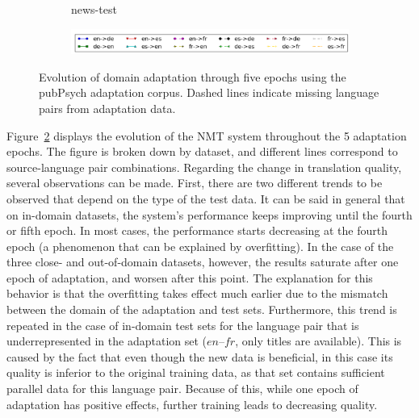 \documentclass[a4paper,11pt]{article}
\begin{document}
\begin{figure}
\begin{subfigure}[b]{0.45\textwidth}
        \caption{news-test}
        \label{fig:news-test}
    \end{subfigure}
    \begin{subfigure}[b]{.9\textwidth}
		\includegraphics[width=\textwidth]{./img/adam/leg}    
    \end{subfigure}
    \caption{Evolution of domain adaptation through five epochs using the pubPsych adaptation corpus. Dashed lines indicate missing language pairs from adaptation data.}\label{fig:adapt_epochs}
\end{figure}

Figure~\ref{fig:adapt_epochs} displays the evolution of the NMT system throughout the 5 adaptation epochs. The figure is broken down by dataset, and different lines correspond to source-language pair combinations. Regarding the change in translation quality, several observations can be made. First, there are two different trends to be observed that depend on the type of the test data. It can be said in general that on in-domain datasets, the system's performance keeps improving until the fourth or fifth epoch. In most cases, the performance starts decreasing at the fourth epoch (a phenomenon that can be explained by overfitting). In the case of the three close- and out-of-domain datasets, however, the results saturate after one epoch of adaptation, and worsen after this point. The explanation for this behavior is that the overfitting takes effect much earlier due to the mismatch between the domain of the adaptation and test sets. Furthermore, this trend is repeated in the case of in-domain test sets for the language pair that is underrepresented in the adaptation set ($en$--$fr$, only titles are available). This is caused by the fact that even though the new data is beneficial, in this case its quality is inferior to the original training data, as that set contains sufficient parallel data for this language pair. Because of this, while one epoch of adaptation has positive effects, further training leads to decreasing quality.
\end{document}
